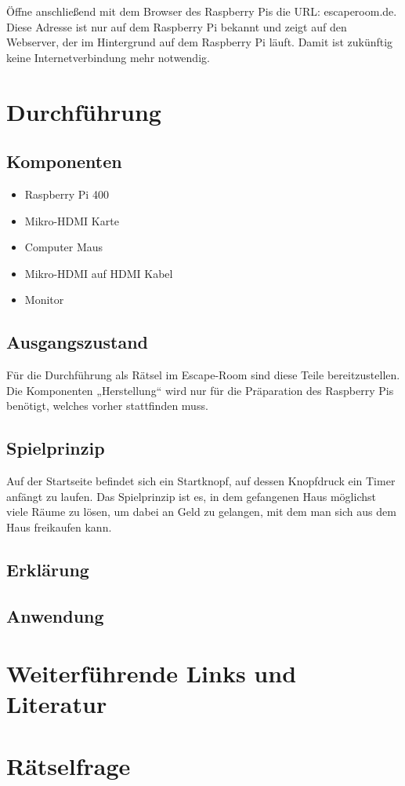 \documentclass[12pt, letterpaper]{article}
\begin{document}
Öffne anschließend mit dem Browser des Raspberry Pis die URL: escaperoom.de.
Diese Adresse ist nur auf dem Raspberry Pi bekannt und zeigt auf den Webserver, der im Hintergrund auf dem Raspberry Pi läuft.
Damit ist zukünftig keine Internetverbindung mehr notwendig.

\section{Durchführung}
\subsection{Komponenten}

\begin{itemize}
	\item Raspberry Pi 400
    \item Mikro-HDMI Karte
	\item Computer Maus
	\item Mikro-HDMI auf HDMI Kabel
	\item Monitor
\end{itemize}

\subsection{Ausgangszustand}

Für die Durchführung als Rätsel im Escape-Room sind diese Teile bereitzustellen.
Die Komponenten „Herstellung“ wird nur für die Präparation des Raspberry Pis benötigt, welches vorher stattfinden muss.

\subsection{Spielprinzip}

Auf der Startseite befindet sich ein Startknopf, auf dessen Knopfdruck ein Timer anfängt zu laufen.
Das Spielprinzip ist es, in dem gefangenen Haus möglichst viele Räume zu lösen, um dabei an Geld zu gelangen, mit dem man sich aus dem Haus freikaufen kann.

\subsection{Erklärung}

\subsection{Anwendung}

\section{Weiterführende Links und Literatur}

\section{Rätselfrage}
\end{document}
